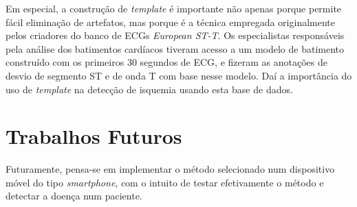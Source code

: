 Em especial, a construção de \emph{template} é importante não apenas porque permite fácil eliminação de artefatos, mas porque é a técnica empregada originalmente pelos criadores do banco de ECGs \emph{European ST-T}. Os especialistas responsáveis pela análise dos batimentos cardíacos tiveram acesso a um modelo de batimento construído com os primeiros 30 segundos de ECG, e fizeram as anotações de desvio de segmento ST e de onda T com base nesse modelo. Daí a importância do uso de \emph{template} na detecção de isquemia usando esta base de dados.


\section{Trabalhos Futuros}

Futuramente, pensa-se em implementar o método selecionado num dispositivo móvel do tipo \emph{smartphone}, com o intuito de testar efetivamente o método e detectar a doença num paciente.